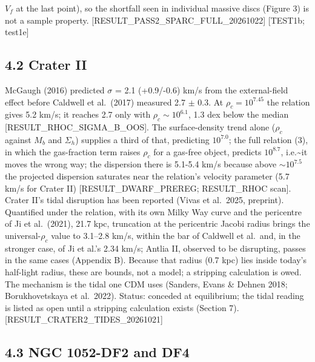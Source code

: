 \documentclass[
  10pt,
]{article}
\begin{document}
$V_f$ at the last point), so the shortfall seen in individual massive discs (Figure 3) is not a sample property. {[}RESULT\_PASS2\_SPARC\_FULL\_20261022{]} {[}TEST1b; test1e{]}


\subsection{4.2 Crater II}

McGaugh (2016) predicted $\sigma$ = 2.1 (+0.9/-0.6) km/s
from the external-field effect before Caldwell et al.~(2017) measured
2.7 $\pm$ 0.3. At $\rho_c=10^{7.45}$ the relation gives 5.2 km/s; it reaches
2.7 only with $\rho_c\sim 10^{6.1}$, 1.3 dex below the
median {[}RESULT\_RHOC\_SIGMA\_B\_OOS{]}. The surface-density trend
alone ($\rho_c$ against $M_b$ and $\Sigma_h$) supplies a third of that,
predicting $10^{7.0}$; the full relation (3), in which the gas-fraction
term raises $\rho_c$ for a gas-free object, predicts $10^{8.7}$, i.e.\textasciitilde{}it
moves the wrong way; the dispersion there is 5.1-5.4 km/s because above
$\sim 10^{7.5}$ the projected dispersion saturates near the
relation's velocity parameter (5.7 km/s for Crater II)
{[}RESULT\_DWARF\_PREREG; RESULT\_RHOC scan{]}. Crater II's tidal
disruption has been reported (Vivas et al.~2025, preprint). Quantified under the relation,
with its own Milky Way curve and the pericentre of Ji et al.~(2021),
21.7 kpc, truncation at the pericentric Jacobi radius brings the
universal-$\rho_c$ value to 3.1--2.8 km/s, within the bar of Caldwell et
al.\ and, in the stronger case, of Ji et al.'s 2.34 km/s; Antlia II, observed
to be disrupting, passes in the same cases (Appendix B). Because that radius
(0.7 kpc) lies inside today's half-light radius, these are bounds, not a
model; a stripping calculation is owed. The mechanism is the tidal one CDM
uses (Sanders, Evans \& Dehnen 2018; Borukhovetskaya et al.~2022). Status: conceded at equilibrium; the tidal reading is listed as open until a stripping calculation exists (Section 7).
{[}RESULT\_CRATER2\_TIDES\_20261021{]}

\subsection{4.3 NGC 1052-DF2 and DF4}
\end{document}
